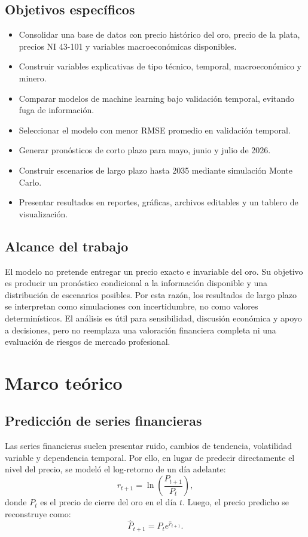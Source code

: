 \documentclass[12pt,letterpaper]{article}
\begin{document}
\subsection{Objetivos específicos}
\begin{itemize}
    \item Consolidar una base de datos con precio histórico del oro, precio de la plata, precios NI 43-101 y variables macroeconómicas disponibles.
    \item Construir variables explicativas de tipo técnico, temporal, macroeconómico y minero.
    \item Comparar modelos de machine learning bajo validación temporal, evitando fuga de información.
    \item Seleccionar el modelo con menor RMSE promedio en validación temporal.
    \item Generar pronósticos de corto plazo para mayo, junio y julio de 2026.
    \item Construir escenarios de largo plazo hasta 2035 mediante simulación Monte Carlo.
    \item Presentar resultados en reportes, gráficas, archivos editables y un tablero de visualización.
\end{itemize}

\subsection{Alcance del trabajo}
El modelo no pretende entregar un precio exacto e invariable del oro. Su objetivo es producir un pronóstico condicional a la información disponible y una distribución de escenarios posibles. Por esta razón, los resultados de largo plazo se interpretan como simulaciones con incertidumbre, no como valores determinísticos. El análisis es útil para sensibilidad, discusión económica y apoyo a decisiones, pero no reemplaza una valoración financiera completa ni una evaluación de riesgos de mercado profesional.

\section{Marco teórico}
\subsection{Predicción de series financieras}
Las series financieras suelen presentar ruido, cambios de tendencia, volatilidad variable y dependencia temporal. Por ello, en lugar de predecir directamente el nivel del precio, se modeló el log-retorno de un día adelante:
\begin{equation}
r_{t+1}=\ln\left(\frac{P_{t+1}}{P_t}\right),
\end{equation}
donde $P_t$ es el precio de cierre del oro en el día $t$. Luego, el precio predicho se reconstruye como:
\begin{equation}
\hat{P}_{t+1}=P_t e^{\hat{r}_{t+1}}.
\end{equation}
\end{document}
